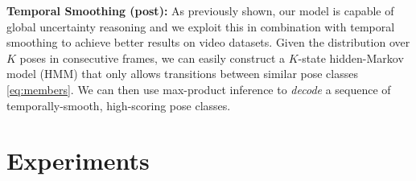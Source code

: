\documentclass[letterpaper]{article} %
\begin{document}
{\bf Temporal Smoothing (post):} As previously shown, our model is capable of global uncertainty reasoning and we exploit this in combination with temporal smoothing to achieve better results on video datasets. Given the distribution over $K$ poses in consecutive frames, we can easily construct a $K$-state hidden-Markov model (HMM) that only allows transitions between similar pose classes \eqref{eq:members}. We can then use max-product inference to {\em decode} a sequence of temporally-smooth, high-scoring pose classes.

\section{Experiments}
\setcounter{secnumdepth}{2}


    

\end{document}
